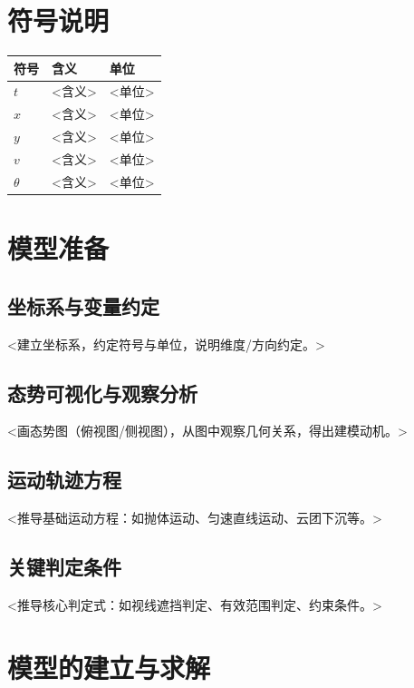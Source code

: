 \documentclass[11pt]{ctexart}
\begin{document}
\section{符号说明}
\begin{center}
\begin{tabular}{lll}
\toprule
符号 & 含义 & 单位 \\
\midrule
$t$ & <含义> & <单位> \\
$x$ & <含义> & <单位> \\
$y$ & <含义> & <单位> \\
$v$ & <含义> & <单位> \\
$\theta$ & <含义> & <单位> \\
\bottomrule
\end{tabular}
\end{center}

\section{模型准备}
\subsection{坐标系与变量约定}
<建立坐标系，约定符号与单位，说明维度/方向约定。>

\subsection{态势可视化与观察分析}
<画态势图（俯视图/侧视图），从图中观察几何关系，得出建模动机。>

\subsection{运动轨迹方程}
<推导基础运动方程：如抛体运动、匀速直线运动、云团下沉等。>

\subsection{关键判定条件}
<推导核心判定式：如视线遮挡判定、有效范围判定、约束条件。>

\section{模型的建立与求解}
\end{document}
